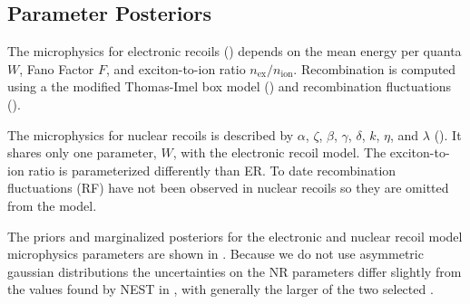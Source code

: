 \subsection{Parameter Posteriors}
\label{subsec:er_nr_calibrations_results_par_post}
The microphysics for electronic recoils () depends on the mean energy
per quanta $W$, Fano Factor $F$, and exciton-to-ion ratio $n_{\mathrm{ex}} / n_{\mathrm{ion}}$.  Recombination is computed using
a the modified Thomas-Imel box model () and recombination fluctuations
().

The microphysics for nuclear recoils is described by $\alpha$, $\zeta$, $\beta$, $\gamma$, $\delta$, $k$, $\eta$, and $\lambda$
().  It shares only one
parameter, $W$, with the electronic recoil model.  The exciton-to-ion ratio is parameterized differently than ER.  To date
recombination fluctuations (RF) have not been observed in nuclear recoils so they are omitted from the model.

The priors and marginalized posteriors for the electronic and nuclear recoil model microphysics parameters are shown in
.  Because we
do not use asymmetric gaussian distributions the uncertainties on the NR parameters differ slightly from the values
found by NEST in , with generally the larger of the two selected
.

